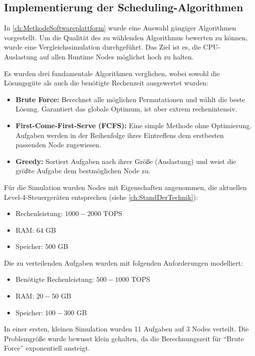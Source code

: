 \subsection{Implementierung der Scheduling-Algorithmen}
\label{sec:ImplementierungAlgorithmen}

In \autoref{ch:MethodeSoftwareplattform} wurde eine Auswahl gängiger Algorithmen vorgestellt. Um die Qualität des zu wählenden Algorithmus bewerten zu können, wurde eine Vergleichssimulation durchgeführt. Das Ziel ist es, die CPU-Auslastung auf allen Runtime Nodes möglichst hoch zu halten.

Es wurden drei fundamentale Algorithmen verglichen, wobei sowohl die Lösungsgüte als auch die benötigte Rechenzeit ausgewertet wurden:
\begin{itemize}
    \item \textbf{Brute Force:} Berechnet alle möglichen Permutationen und wählt die beste Lösung. Garantiert das globale Optimum, ist aber extrem rechenintensiv.
    \item \textbf{First-Come-First-Serve (FCFS):} Eine simple Methode ohne Optimierung. Aufgaben werden in der Reihenfolge ihres Eintreffens dem erstbesten passenden Node zugewiesen.
    \item \textbf{Greedy:} Sortiert Aufgaben nach ihrer Größe (Auslastung) und weist die größte Aufgabe dem bestmöglichen Node zu.
\end{itemize}

Für die Simulation wurden Nodes mit Eigenschaften angenommen, die aktuellen Level-4-Steuergeräten entsprechen (siehe \autoref{ch:StandDerTechnik}):
\begin{itemize}
    \item Rechenleistung: $1000 - 2000$ TOPS
    \item RAM: $64$ GB
    \item Speicher: $500$ GB
\end{itemize}

Die zu verteilenden Aufgaben wurden mit folgenden Anforderungen modelliert:
\begin{itemize}
    \item Benötigte Rechenleistung: $500 - 1000$ TOPS
    \item RAM: $20 - 50$ GB
    \item Speicher: $100 - 300$ GB
\end{itemize}

In einer ersten, kleinen Simulation wurden 11 Aufgaben auf 3 Nodes verteilt. Die Problemgröße wurde bewusst klein gehalten, da die Berechnungszeit für \enquote{Brute Force} exponentiell ansteigt.

